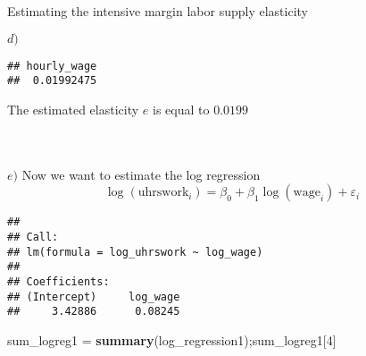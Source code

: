 \documentclass[
  ignorenonframetext,
]{beamer}
\newenvironment{Shaded}{\begin{snugshade}}{\end{snugshade}}
\newcommand{\DataTypeTok}[1]{\textcolor[rgb]{0.13,0.29,0.53}{#1}}
\newcommand{\DecValTok}[1]{\textcolor[rgb]{0.00,0.00,0.81}{#1}}
\newcommand{\KeywordTok}[1]{\textcolor[rgb]{0.13,0.29,0.53}{\textbf{#1}}}
\newcommand{\NormalTok}[1]{#1}
\newcommand{\OperatorTok}[1]{\textcolor[rgb]{0.81,0.36,0.00}{\textbf{#1}}}
\newcommand{\OtherTok}[1]{\textcolor[rgb]{0.56,0.35,0.01}{#1}}
\newcommand{\StringTok}[1]{\textcolor[rgb]{0.31,0.60,0.02}{#1}}
\begin{document}
\begin{frame}[fragile]{Estimating the intensive margin labor supply
elasticity}
\begin{block}{\(d)\)}
\begin{Shaded}
\end{Shaded}

\begin{verbatim}
## hourly_wage 
##  0.01992475
\end{verbatim}

The estimated elasticity \(e\) is equal to \(0.0199\)\\
~\\
~\\
\end{block}

\begin{block}{\(e)\)}
\protect\hypertarget{e}{}
\hfill\break
Now we want to estimate the log regression
\[\log(\textrm{uhrswork}_i) = \beta_0 + \beta_1 \log(\textrm{wage}_i) + \varepsilon_i\]

\begin{Shaded}
\end{Shaded}

\begin{verbatim}
## 
## Call:
## lm(formula = log_uhrswork ~ log_wage)
## 
## Coefficients:
## (Intercept)     log_wage  
##     3.42886      0.08245
\end{verbatim}

\begin{Shaded}
\begin{Highlighting}[]
\NormalTok{sum\_logreg1 =}\StringTok{ }\KeywordTok{summary}\NormalTok{(log\_regression1);sum\_logreg1[}\DecValTok{4}\NormalTok{]}
\end{Highlighting}
\end{Shaded}


\end{block}
\end{frame}
\end{document}
